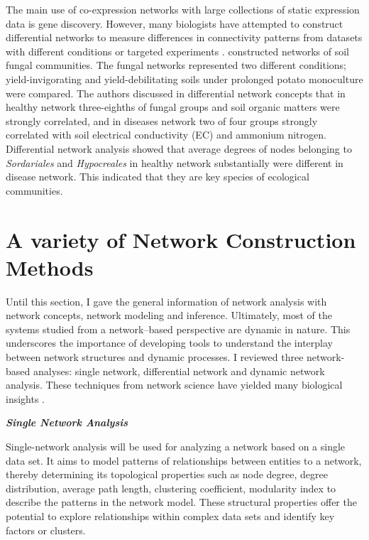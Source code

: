 \documentclass[12pt, oneside]{report}
\begin{document}
The main use of co-expression networks with large collections of static expression data is gene discovery. However, many biologists have attempted to construct differential networks to measure differences in connectivity patterns from datasets with different conditions or targeted experiments \citep{Toubiana:2013cv}. \citet{Lu:2013hga} constructed networks of soil fungal communities. The fungal networks represented two different conditions; yield-invigorating and yield-debilitating soils under prolonged potato monoculture were compared. The authors discussed in differential network concepts that in healthy network three-eighths of fungal groups and soil organic matters were strongly correlated, and in diseases network two of four groups strongly correlated with soil electrical conductivity (EC) and ammonium nitrogen. Differential network analysis showed that average degrees of nodes belonging to \textit{Sordariales} and \textit{Hypocreales} in healthy network substantially were different in disease network. This indicated that they are key species of ecological communities.

\section*{A variety of Network Construction Methods}

Until this section, I gave the general information of network analysis with network concepts, network modeling and inference. Ultimately, most of the systems studied from a network--based perspective are dynamic in nature. This underscores the importance of developing tools to understand the interplay between network structures and dynamic processes. I reviewed three network-based analyses: single network, differential network and dynamic network analysis. These techniques from network science have yielded many biological insights \citep{Idekerdiffnet}.

\textbf{\textit{Single Network Analysis}}

Single-network analysis will be used for analyzing a network based on a single data set. It aims to model patterns of relationships between entities to a network, thereby determining its topological properties such as node degree, degree distribution, average path length, clustering coefficient, modularity index \citep{newman2006modularity} to describe the patterns in the network model. These structural properties offer the potential to explore relationships within complex data sets and identify key factors or clusters.
\end{document}
